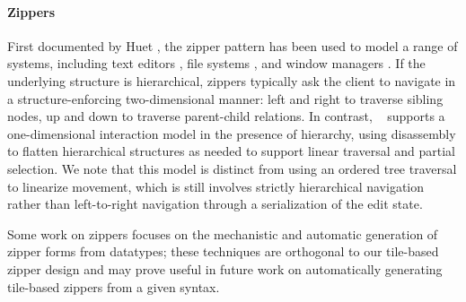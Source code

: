 \paragraph{Zippers}
First documented by Huet
\cite{zipper}, the zipper pattern has been used to model a range of systems,
including text editors \cite{lazy-functional-incremental-parsing},
file systems \cite{zipper-fs}, and window managers \cite{window-manager}.
If the underlying structure is hierarchical,
zippers typically ask the client to navigate
in a structure-enforcing two-dimensional manner: left and right to traverse
sibling nodes, up and down to traverse parent-child relations.
In contrast, \ty~ supports a one-dimensional interaction model
in the presence of hierarchy, using disassembly to flatten
hierarchical structures as needed to support linear traversal
and partial selection.
We note that this model is distinct from using an ordered tree
traversal to linearize movement, which is still involves
strictly hierarchical navigation rather than
left-to-right navigation through a serialization of the edit state.

Some work on zippers focuses on the mechanistic \cite{derivative-zippers,clowns-jokers}
and automatic \cite{syz} generation of zipper forms
from datatypes;
these techniques are orthogonal to our tile-based zipper design
and may prove useful in future work on
automatically generating tile-based zippers
from a given syntax.



